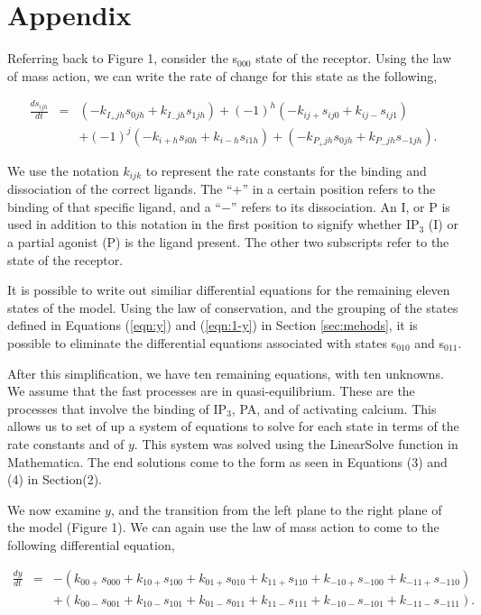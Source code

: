 \documentclass[preprint,12pt]{elsarticle}
\begin{document}
\section{Appendix}
Referring back to Figure 1, consider the s$_{000}$ state of the receptor. Using the law of mass action, we can write the rate of change for this state as the following,

\begin{eqnarray}
	\frac{ds_{ijh}}{dt} &=& (-k_{I_+jh}s_{0jh} + k_{I_-jh}s_{1jh}) + (-1)^h(-k_{ij+}s_{ij0}+k_{ij-}s_{ij1}) \nonumber \\ 
& & + (-1)^j(-k_{i+h}s_{i0h}+k_{i-h}s_{i1h}) + (-k_{P_+jh}s_{0jh}+
k_{P_-jh}s_{-1jh}). \nonumber \
\end{eqnarray}

We use the notation $k_{ijk}$ to represent the rate constants for the binding and dissociation of the correct ligands. The ``$+$'' in a certain position refers to the binding of that specific ligand, and a ``$-$'' refers to its dissociation. An I, or P is used in addition to this notation in the first position to signify whether IP$_3$ (I) or a partial agonist (P) is the ligand present. The other two subscripts refer to the state of the receptor.

It is possible to write out similiar differential equations for the remaining eleven states of the model. Using the law of conservation, and the grouping of the states defined in Equations (\ref{eqn:y}) and (\ref{eqn:1-y}) in Section \ref{sec:mehods}, it is possible to eliminate the differential equations associated with states s$_{010}$ and s$_{011}$. 

After this simplification, we have ten remaining equations, with ten unknowns. We assume that the fast processes are in quasi-equilibrium. These are the processes that involve the binding of IP$_3$, PA, and of activating calcium. This allows us to set of up a system of equations to solve for each state in terms of the rate constants and of $y$. This system was solved using the LinearSolve function in Mathematica. The end solutions come to the form as seen in Equations (3) and (4) in Section(2).

We now examine $y$, and the transition from the left plane to the right plane of the model (Figure 1). We can again use the law of mass action to come to the following differential equation,

\begin{eqnarray}
	\frac{dy}{dt} &=& -(k_{00+}s_{000}+k_{10+}s_{100}+k_{01+}s_{010}+k_{11+}s_{110}+k_{-10+}s_{-100}
+k_{-11+}s_{-110}) \nonumber \\
& & + (k_{00-}s_{001}+k_{10-}s_{101}+k_{01-}s_{011}+k_{11-}s_{111}+k_{-10-}s_{-101}
+k_{-11-}s_{-111}). \nonumber \
\end{eqnarray}
\end{document}
